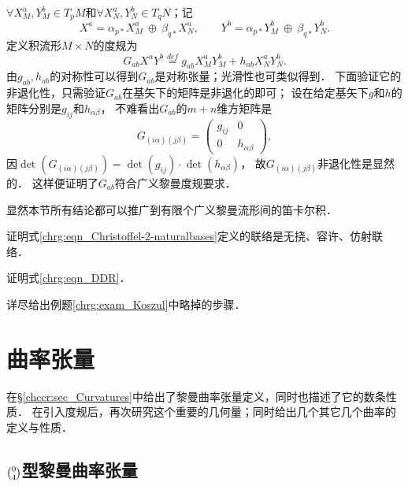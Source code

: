 $\forall X_M^a, Y_M^b \in T_p M$和$\forall X_N^a, Y_N^b \in T_q N$；记
\begin{equation}
    X^a=\alpha_{p*} X_M^a \ \oplus\ \beta_{q*}  X_N^a, \qquad Y^b=\alpha_{p*} Y_M^b \ \oplus\ \beta_{q*}  Y_N^b .
\end{equation}
定义积流形$M\times N$的度规为
\begin{equation}\label{chrg:eqn_metric-product}
    G_{ab}X^a Y^b \overset{def}{=} g_{ab}X^a_M Y^b_M + h_{ab}X^a_N Y^b_N .
\end{equation}
由$g_{ab},h_{ab}$的对称性可以得到$G_{ab}$是对称张量；光滑性也可类似得到．
下面验证它的非退化性，只需验证$G_{ab}$在基矢下的矩阵是非退化的即可；
设在给定基矢下$g$和$h$的矩阵分别是$g_{ij}$和$h_{\alpha\beta}$，
不难看出$G_{ab}$的$m+n$维方矩阵是
\begin{equation}
    G_{(i\alpha)(j\beta)}=\begin{pmatrix}
        g_{ij} & 0 \\ 0 & h_{\alpha\beta}
    \end{pmatrix},
\end{equation}
因$\det(G_{(i\alpha)(j\beta)})=\det(g_{ij}) \cdot \det(h_{\alpha\beta})$，
故$G_{(i\alpha)(j\beta)}$非退化性是显然的．
这样便证明了$G_{ab}$符合广义黎曼度规要求．


显然本节所有结论都可以推广到有限个广义黎曼流形间的笛卡尔积．

\begin{exercise}
	证明式\eqref{chrg:eqn_Christoffel-2-naturalbases}定义的联络是无挠、容许、仿射联络．
\end{exercise}

\begin{exercise}
	证明式\eqref{chrg:eqn_DDR}．
\end{exercise}

\begin{exercise}
	详尽给出例题\ref{chrg:exam_Koszul}中略掉的步骤．
\end{exercise}


\section{曲率张量}
在\S \ref{chccr:sec_Curvatures}中给出了黎曼曲率张量定义，同时也描述了它的数条性质．
在引入度规后，再次研究这个重要的几何量；同时给出几个其它几个曲率的定义与性质．

\subsection{$\binom{0}{4}$型黎曼曲率张量}\label{chrg:sec_R04}

